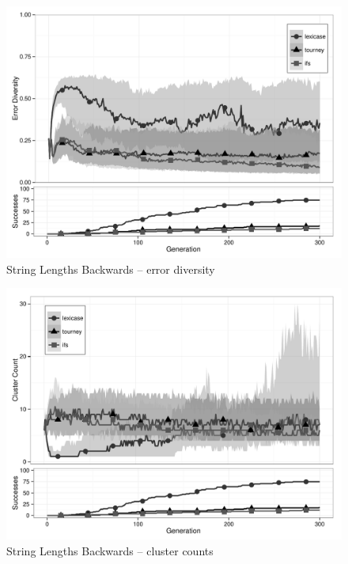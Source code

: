 \begin{figure}[p] %
\centering
\includegraphics[width=11.5cm]{string-lengths-backwards-diversity.pdf}
\caption{String Lengths Backwards -- error diversity}
\label{string-lengths-backwardsDiv}
\end{figure}

\begin{figure}[p] %
\centering
\includegraphics[width=11.5cm]{string-lengths-backwards-cluster.pdf}
\caption{String Lengths Backwards -- cluster counts}
\label{string-lengths-backwardsClu}
\end{figure}

